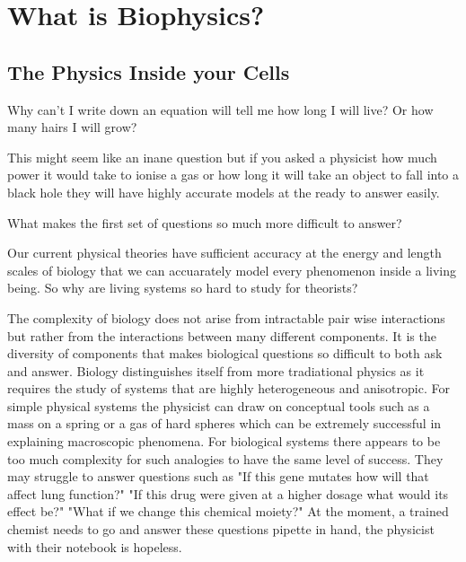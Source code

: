 \chapter{What is Biophysics?}
\setcounter{page}{1}
\label{chap:intro}
 {}

\section{The Physics Inside your Cells}
\chapquote{}{}

\vskip 0.5cm

Why can't I  write down an equation will tell me how long I will live? Or how many hairs I will grow?

This might seem like an inane question but if you asked a physicist how much power it would take to ionise a gas or how long it will take an object to fall into a black hole they will have highly accurate models at the ready to answer easily. 

What makes the first set of questions so much more difficult to answer?

Our current physical theories have sufficient accuracy at the energy and length scales of biology that we can accuarately model every phenomenon inside a living being\cite{carroll2021}. So why are living systems so hard to study for theorists?

The complexity of biology does not arise from intractable pair wise interactions but rather from the interactions between many different components. It is the diversity of components that makes biological questions so difficult to both ask and answer. Biology distinguishes itself from more tradiational physics as it requires the study of systems that are highly heterogeneous and anisotropic. For simple physical systems the physicist can draw on conceptual tools such as a mass on a spring or a gas of hard spheres which can be extremely successful in explaining macroscopic phenomena. For biological systems there appears to be too much complexity for such analogies to have the same level of success. They may struggle to answer questions such as "If this gene mutates how will that affect lung function?" "If this drug were given at a higher dosage what would its effect be?" "What if we change this chemical moiety?" At the moment, a trained chemist needs to go and answer these questions pipette in hand, the physicist with their notebook is hopeless.

